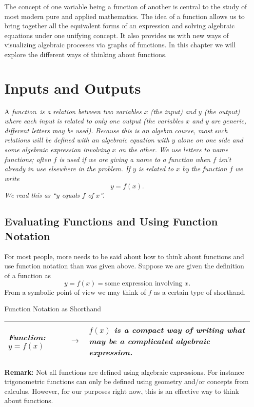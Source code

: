 
The concept of one variable being a function of another is central to the study of most modern pure and applied mathematics. The idea of a function allows us to bring together all the equivalent forms of an expression and solving algebraic equations under one unifying concept. It also provides us with new ways of visualizing algebraic processes via graphs of functions. In this chapter we will explore the different ways of thinking about functions.


\section{Inputs and Outputs}

A \it{function}\normalfont\ is a relation between two variables $x$ (the input) and $y$ (the output) where each input is related to only one output (the variables $x$ and $y$ are generic, different letters may be used). Because this is an algebra course, most such relations will be defined with an algebraic equation with $y$ alone on one side and some algebraic expression involving $x$ on the other. We use letters to name functions; often $f$ is used if we are giving a name to a function when $f$ isn't already in use elsewhere in the problem. If $y$ is related to $x$ by the function $f$ we write
\[
y = f(x).
\]
We read this as ``$y$ equals $f$ of $x$''. 

\subsection{Evaluating Functions and Using Function Notation}

For most people, more needs to be said about how to think about functions and use function notation than was given above. Suppose we are given the definition of a function as
\[
y = f(x) = \mbox{some expression involving } x.
\]
From a symbolic point of view we may think of $f$ as a certain type of shorthand.

\begin{center}
Function Notation as Shorthand 
\begin{tabular}{|p{1.5in} c p{2in} |}
\hline\hline \it{Function: $y = f(x)$} & $\longrightarrow$ & \it{$f(x)$ is a compact way of writing what may be a complicated algebraic expression. }\normalfont\\
\hline
\end{tabular}
\end{center} 

{\bf Remark:} Not all functions are defined using algebraic expressions. For instance trigonometric functions can only be defined using geometry and/or concepts from calculus. However, for our purposes right now, this is an effective way to think about functions.

